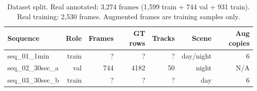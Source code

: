 \begin{table}[ht]
\centering
\caption{Dataset split. Real annotated: 3,274 frames (1,599 train + 744 val + 931 train). Real training: 2,530 frames. Augmented frames are training samples only.}
\label{tab:dataset}
\begin{tabular}{lrrrrrr}
\toprule
Sequence & Role & Frames & GT rows & Tracks & Scene & Aug copies \\
\midrule
seq_01_1min & train & ? & ? & ? & day/night & 6 \\
seq_02_30sec_a & val & 744 & 4182 & 50 & night & N/A \\
seq_03_30sec_b & train & ? & ? & ? & day & 6 \\
\bottomrule
\end{tabular}
\end{table}
